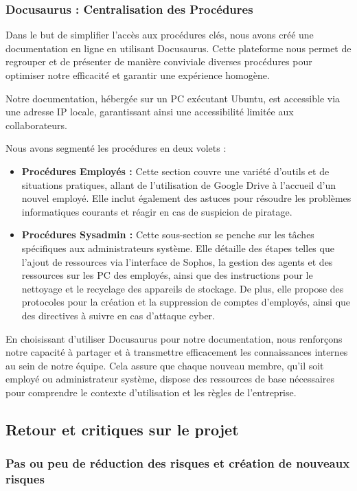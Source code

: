 \subsubsection{Docusaurus : Centralisation des Procédures}
Dans le but de simplifier l'accès aux procédures clés, nous avons créé une documentation en ligne en utilisant Docusaurus.
Cette plateforme nous permet de regrouper et de présenter de manière conviviale diverses procédures pour optimiser notre efficacité et garantir une expérience homogène.

Notre documentation, hébergée sur un PC  exécutant Ubuntu, est accessible via une adresse IP locale, garantissant ainsi une accessibilité limitée aux collaborateurs.

Nous avons segmenté les procédures en deux volets :
\begin{itemize}
    \item \textbf{Procédures Employés :} Cette section couvre une variété d'outils et de situations pratiques, allant de l'utilisation de Google Drive à l'accueil d'un nouvel employé.
    Elle inclut également des astuces pour résoudre les problèmes informatiques courants et réagir en cas de suspicion de piratage.
    \item \textbf{Procédures Sysadmin :} Cette sous-section se penche sur les tâches spécifiques aux administrateurs système.
    Elle détaille des étapes telles que l'ajout de ressources via l'interface de Sophos, la gestion des agents et des ressources sur les PC des employés, ainsi que des instructions pour le nettoyage et le recyclage des appareils de stockage.
    De plus, elle propose des protocoles pour la création et la suppression de comptes d'employés, ainsi que des directives à suivre en cas d'attaque cyber.
\end{itemize}

En choisissant d'utiliser Docusaurus pour notre documentation, nous renforçons notre capacité à partager et à transmettre efficacement les connaissances internes au sein de notre équipe.
Cela assure que chaque nouveau membre, qu'il soit employé ou administrateur système, dispose des ressources de base nécessaires pour comprendre le contexte d'utilisation et les règles de l'entreprise.


\subsection{Retour et critiques sur le projet}
\subsubsection{Pas ou peu de réduction des risques et création de nouveaux risques}

